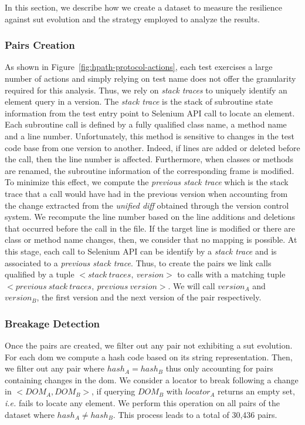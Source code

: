 In this section, we describe how we create a dataset to measure the resilience against \gls{sut} evolution and the strategy employed to analyze the results.

\subsubsection{Pairs Creation}
\label{sec:hpath-protocol-pairs}

As shown in Figure~\ref{fig:hpath-protocol-actions}, each test exercises a large number of actions and simply relying on test name does not offer the granularity required for this analysis. Thus, we rely on \emph{stack traces} to uniquely identify an element query in a version. The \emph{stack trace} is the stack of subroutine state information from the test entry point to Selenium API call to locate an element. Each subroutine call is defined by a fully qualified class name, a method name and a line number. Unfortunately, this method is sensitive to changes in the test code base from one version to another. Indeed, if lines are added or deleted before the call, then the line number is affected. Furthermore, when classes or methods are renamed, the subroutine information of the corresponding frame is modified. To minimize this effect, we compute the \emph{previous stack trace} which is the stack trace that a call would have had in the previous version when accounting from the change extracted from the \emph{unified diff} obtained through the version control system. We recompute the line number based on the line additions and deletions that occurred before the call in the file. If the target line is modified or there are class or method name changes, then, we consider that no mapping is possible. At this stage, each call to Selenium API can be identify by a \emph{stack trace} and is associated to a \emph{previous stack trace}. Thus, to create the pairs we link calls qualified by a tuple $<stack\:traces,\:version>$ to calls with a matching tuple $<previous\:stack\:traces,\:previous\:version>$. We will call $version_A$ and $version_B$, the first version and the next version of the pair respectively.

\subsubsection{Breakage Detection}
\label{sec:hpath-protocol-breakage-detection}

Once the pairs are created, we filter out any pair not exhibiting a \gls{sut} evolution. For each \gls{dom} we compute a hash code based on its string representation. Then, we filter out any pair where $hash_A = hash_B$ thus only accounting for pairs containing changes in the \gls{dom}. We consider a locator to break following a change in $<DOM_A, DOM_B>$, if querying $DOM_B$ with $locator_A$ returns an empty set, \emph{i.e.} fails to locate any element. We perform this operation on all pairs of the dataset where $hash_A \neq hash_B$. This process leads to a total of 30,436 pairs.

